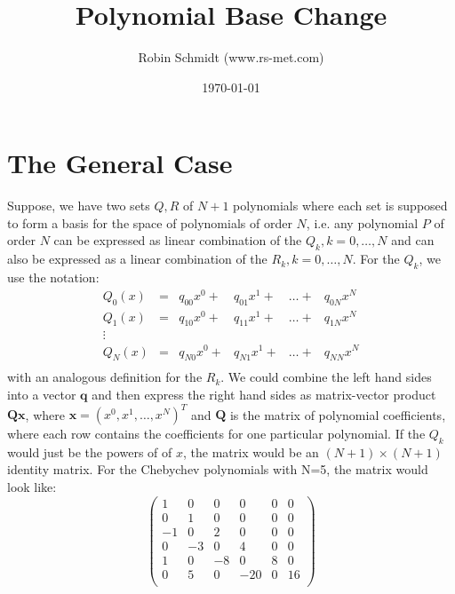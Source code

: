 \title{Polynomial Base Change}
\author{Robin Schmidt (www.rs-met.com)}
\date{\today}
\maketitle

\section{The General Case}
Suppose, we have two sets $Q, R$ of $N+1$ polynomials where each set is supposed to form a basis for the space of polynomials of order $N$, i.e. any polynomial $P$ of order $N$ can be expressed as linear combination of the $Q_k, k = 0, \ldots, N$ and can also be expressed as a linear combination of the $R_k, k = 0, \ldots, N$. For the $Q_k$, we use the notation:
\begin{equation}
 \begin{aligned}
  Q_0(x) &= &q_{00} x^0 + &q_{01} x^1 + & \ldots + & q_{0N} x^N \\ 
  Q_1(x) &= &q_{10} x^0 + &q_{11} x^1 + & \ldots + & q_{1N} x^N \\ 
  \vdots \\
  Q_N(x) &= &q_{N0} x^0 + &q_{N1} x^1 + & \ldots + & q_{NN} x^N \\ 
 \end{aligned}
\end{equation}
with an analogous definition for the $R_k$. We could combine the left hand sides into a vector $\mathbf{q}$ and then express the right hand sides as matrix-vector product $\mathbf{Q} \mathbf{x}$, where $\mathbf{x} = (x^0, x^1, \ldots, x^N)^T$ and $\mathbf{Q}$ is the matrix of polynomial coefficients, where each row contains the coefficients for one particular polynomial. If the $Q_k$ would just be the powers of of $x$, the matrix would be an $(N+1) \times (N+1)$ identity matrix. For the Chebychev polynomials with N=5, the matrix would look like:
\begin{equation}
 \begin{pmatrix}
   1 &  0 &  0 &   0 & 0 &  0 \\ 
   0 &  1 &  0 &   0 & 0 &  0 \\ 
  -1 &  0 &  2 &   0 & 0 &  0 \\   
   0 & -3 &  0 &   4 & 0 &  0 \\    
   1 &  0 & -8 &   0 & 8 &  0 \\       
   0 &  5 &  0 & -20 & 0 & 16 \\       
 \end{pmatrix}
\end{equation}
